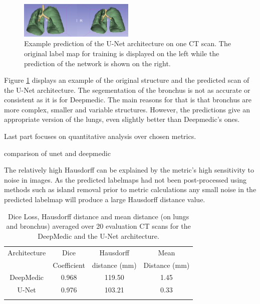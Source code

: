 \begin{figure}[h!]
	\includegraphics[width=0.49\textwidth, angle=0]{files/predunet.png}
	\caption{Example prediction of the U-Net architecture on one CT scan. The original label map for training is displayed on the left while the prediction of the network is shown on the right.}
	\label{pred_unet}
\end{figure}

Figure \ref{pred_unet} displays an example of the original structure and the predicted scan of the U-Net architecture. The segementation of the bronchus is not as accurate or consistent as it is for Deepmedic. The main reasons for that is that bronchus are more complex, smaller and variable structures. However, the predictions give an appropriate version of the lungs, even slightly better than Deepmedic's ones.\newline\newline

Last part focuses on quantitative analysis over chosen metrics.

comparison of unet and deepmedic

The relatively high Hausdorff can be explained by the metric's high sensitivity to noise in images. As the predicted labelmaps had not been post-processed using methods such as island removal prior to metric calculations any small noise in the predicted labelmap will produce a large Hausdorff distance value.

\begin{table}[h!]
	\caption{Dice Loss, Hausdorff distance and mean distance (on lungs and bronchus) averaged over 20 evaluation CT scans for the DeepMedic and the U-Net architecture.}
	\label{table_result}
	\centering
	\setlength{\tabcolsep}{10pt}
	\renewcommand{\arraystretch}{1.5}
	\begin{tabular}{c c c c}
		\hline 
		Architecture & Dice & Hausdorff & Mean \\
		& Coefficient & distance (mm) & Distance (mm) \\ 
		\hline 
		DeepMedic & 0.968 & 119.50 & 1.45 \\ 
		U-Net & 0.976 & 103.21 & 0.33 \\ 
		\hline
		\newline 
	\end{tabular}

\end{table}
